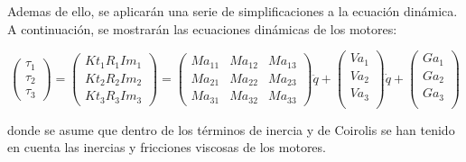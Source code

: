 Ademas de ello, se aplicarán una serie de simplificaciones a la ecuación dinámica. A continuación, se mostrarán las ecuaciones dinámicas de los motores:\\
\begin{center}
	$$
	\begin{pmatrix}
	 \tau_{1} \\
	 \tau_{2} \\
	 \tau_ {3}
	\end{pmatrix}=
	\begin{pmatrix}
	Kt_{1}R_{1}Im_{1}  \\
	Kt_{2}R_{2}Im_{2}  \\
	Kt_{3}R_{3}Im_{3}
	\end{pmatrix} =
	\begin{pmatrix}
	Ma_{11} & Ma_{12} & Ma_{13}  \\
	Ma_{21} & Ma_{22} & Ma_{23}  \\
	Ma_{31} & Ma_{32} & Ma_{33}
	\end{pmatrix}
	\ddot{q}+
	\begin{pmatrix}
	Va_{1} \\
	Va_{2} \\
	Va_{3} \\
	\end{pmatrix}
	\dot{q}+
	\begin{pmatrix}
	Ga_{1}  \\
	Ga_{2}  \\
	Ga_{3}\\
	\end{pmatrix}
	$$
\end{center}
donde se asume que dentro de los términos de inercia y de Coirolis se han tenido en cuenta las inercias y fricciones viscosas de los motores.\\

